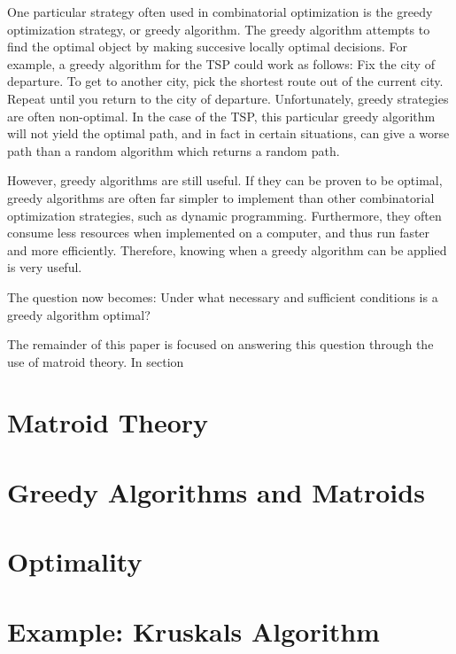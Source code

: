 \documentclass[a4paper,11pt]{report}
\begin{document}
One particular strategy often used in combinatorial optimization is the greedy
optimization strategy, or greedy algorithm. The greedy algorithm attempts to
find the optimal object by making succesive locally optimal decisions. For
example, a greedy algorithm for the TSP could work as follows: Fix the city
of departure. To get to another city, pick the shortest route out of the
current city. Repeat until you return to the city of departure.
Unfortunately, greedy strategies are often non-optimal. In the case of the
TSP, this particular greedy algorithm will not yield the optimal path, and
in fact in certain situations, can give a worse path than a random algorithm
which returns a random path.

However, greedy algorithms are still useful. If they can be proven to be
optimal, greedy algorithms are often far simpler to implement than other
combinatorial optimization strategies, such as dynamic programming.
Furthermore, they often consume less resources when implemented on a computer,
and thus run faster and more efficiently. Therefore, knowing when a greedy
algorithm can be applied is very useful.

The question now becomes: Under what necessary and sufficient conditions
is a greedy algorithm optimal?

The remainder of this paper is focused on answering this question through
the use of matroid theory. In section

\section{Matroid Theory}

\section{Greedy Algorithms and Matroids}

\section{Optimality}

\section{Example: Kruskals Algorithm}

\nocite{*}

\clearpage


\end{document}

